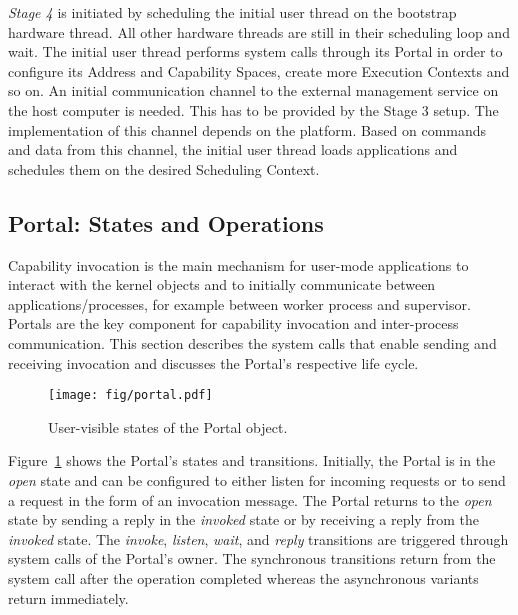 \emph{Stage 4} is initiated by scheduling the initial user thread on the bootstrap hardware thread. All other hardware threads are still in their scheduling loop and wait. The initial user thread performs system calls through its Portal in order to configure its Address and Capability Spaces, create more Execution Contexts and so on. An initial communication channel to the external management service on the host computer is needed. This has to be provided by the Stage 3 setup. The implementation of this channel depends on the platform. Based on commands and data from this channel, the initial user thread loads applications and schedules them on the desired Scheduling Context.

\subsection{Portal: States and Operations}
\label{sec:portal-dyn}

Capability invocation is the main mechanism for user-mode applications to interact with the kernel objects and to initially communicate between applications/processes, for example between worker process and supervisor. Portals  are the key component for capability invocation and inter-process communication. This section describes the system calls that enable sending and receiving invocation and discusses the Portal's respective life cycle.

\begin{figure}
\begin{center}
\texttt{[image: fig/portal.pdf]}
\caption{User-visible states of the Portal object.}
\label{fig:portal:state}
\end{center}
\end{figure}

Figure~\ref{fig:portal:state} shows the Portal's states and transitions. Initially, the Portal is in the \emph{open} state and can be configured to either listen for incoming requests or to send a request in the form of an invocation message. The Portal returns to the \emph{open} state by sending a reply in the \emph{invoked} state or by receiving a reply from the \emph{invoked} state. The \emph{invoke}, \emph{listen}, \emph{wait}, and \emph{reply} transitions are triggered through system calls of the Portal's owner. The synchronous transitions return from the system call after the operation completed whereas the asynchronous variants return immediately. 

